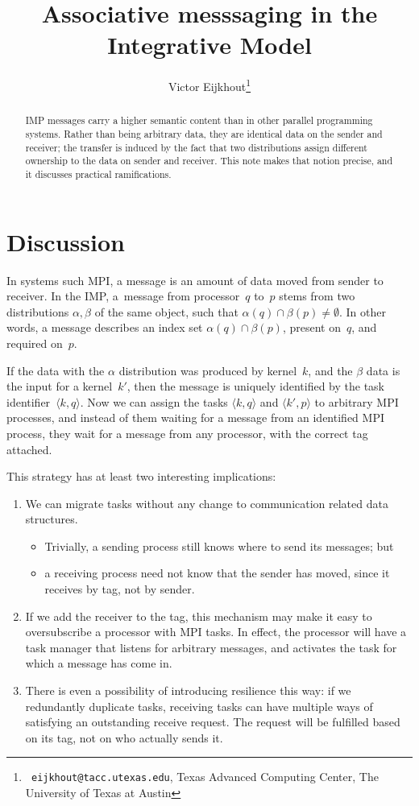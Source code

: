 \documentclass[11pt,fleqn,preprint]{impreport}
\title[IMP messages]{Associative messsaging in the Integrative Model}
\author[Eijkhout]{Victor Eijkhout\thanks{{\tt
      eijkhout@tacc.utexas.edu}, Texas Advanced Computing Center, The
    University of Texas at Austin}}
\begin{document}
\maketitle

\begin{abstract}
IMP messages carry a higher semantic content than in other 
parallel programming systems. Rather than being arbitrary data,
they are identical data on the sender and receiver;
the transfer is induced by the fact that two distributions
assign different ownership to the data on sender and receiver.
This note makes that notion precise, and it discusses practical 
ramifications.
\end{abstract}

\section{Discussion}

In systems such MPI, a message is an amount of data moved from sender to receiver.
In the \acf{IMP}, a~message from processor~$q$ to~$p$ stems from two distributions
$\alpha,\beta$ of the same object,
such that $\alpha(q)\cap \beta(p)\not=\emptyset$. 
In other words, a message describes an index set $\alpha(q)\cap \beta(p)$, 
present on~$q$, and required on~$p$.

If the data with the $\alpha$ distribution was produced by kernel~$k$, and
the $\beta$ data is the input for a kernel~$k'$, then the message
is uniquely identified by the task identifier~$\langle k,q\rangle$.
Now we can assign the tasks $\langle k,q\rangle$ and $\langle k',p\rangle$
to arbitrary MPI processes, and instead of them waiting for a message
from an identified MPI process, they wait for a message from any processor,
with the correct tag attached.

This strategy has at least two interesting implications:
\begin{enumerate}
\item We can migrate tasks without any change to communication related data structures.
  \begin{itemize}
  \item Trivially, a sending process still knows where to send its messages; but
  \item a receiving process need not know that the sender has moved, since it receives
    by tag, not by sender.
  \end{itemize}
\item If we add the receiver to the tag,
  this mechanism may make it easy to oversubscribe a processor with MPI tasks.
  In effect, the processor will have a task manager that listens for arbitrary messages,
  and activates the task for which a message has come in.
\item There is even a possibility of introducing resilience this way: if we redundantly 
  duplicate tasks, receiving tasks can have multiple ways of satisfying an outstanding receive request.
  The request will be fulfilled based on its tag, not on who actually sends it.
\end{enumerate}

\end{document}
